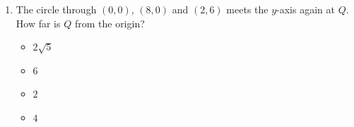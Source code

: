 \documentclass[11pt,a4paper]{article}
\begin{document}
\begin{enumerate}
\item The circle through $(0,0)$, $(8,0)$ and $(2,6)$ meets the $y$-axis again at $Q$. How far is $Q$ from the origin?
\begin{itemize}
\item[A)] $2\sqrt5$
\item[B)] $6$
\item[C)] $2$
\item[D)] $4$
\end{itemize}

\end{enumerate}

\end{document}
